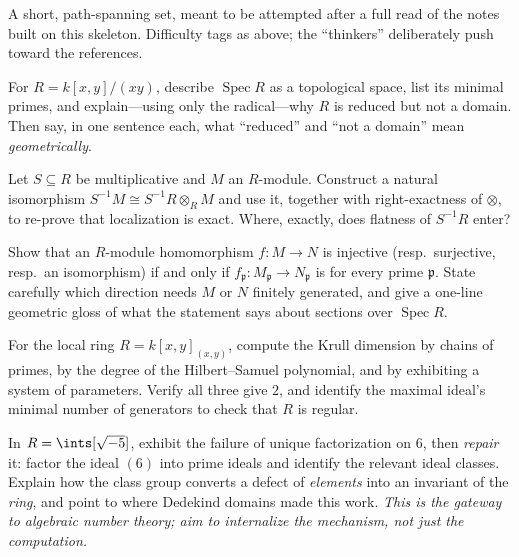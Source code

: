 \documentclass[11pt]{article}
\DeclareMathOperator{\Spec}{Spec}
\newcommand{\mfp}{\mathfrak{p}}
\begin{document}
\noindent
A short, path-spanning set, meant to be attempted after a full read of the notes built on
this skeleton. Difficulty tags as above; the ``thinkers'' deliberately push toward the
references.

\begin{xca}
For $R=k[x,y]/(xy)$, describe $\Spec R$ as a topological space, list its minimal primes, and
explain---using only the radical---why $R$ is reduced but not a domain. Then say, in one
sentence each, what ``reduced'' and ``not a domain'' mean \emph{geometrically}.
\end{xca}

\begin{xca}
Let $S\subseteq R$ be multiplicative and $M$ an $R$-module. Construct a natural isomorphism
$S^{-1}M \cong S^{-1}R \otimes_R M$ and use it, together with right-exactness of $\otimes$, to
re-prove that localization is exact. Where, exactly, does flatness of $S^{-1}R$ enter?
\end{xca}

\begin{xca}
Show that an $R$-module homomorphism $f\colon M\to N$ is injective (resp.\ surjective, resp.\
an isomorphism) if and only if $f_\mfp\colon M_\mfp\to N_\mfp$ is for every prime $\mfp$. State
carefully which direction needs $M$ or $N$ finitely generated, and give a one-line geometric
gloss of what the statement says about sections over $\Spec R$.
\end{xca}

\begin{xca}[\textbf{(medium)} dimension three ways, on one example]
For the local ring $R=k[x,y]_{(x,y)}$, compute the Krull dimension by chains of primes, by
the degree of the Hilbert--Samuel polynomial, and by exhibiting a system of parameters. Verify
all three give $2$, and identify the maximal ideal's minimal number of generators to check
that $R$ is regular.
\end{xca}

\begin{xca}
In $R=\ints[\sqrt{-5}]$, exhibit the failure of unique factorization on $6$, then \emph{repair}
it: factor the ideal $(6)$ into prime ideals and identify the relevant ideal classes. Explain
how the class group converts a defect of \emph{elements} into an invariant of the \emph{ring},
and point to where Dedekind domains made this work. \emph{This is the gateway to algebraic
number theory; aim to internalize the mechanism, not just the computation.}
\end{xca}
\end{document}
